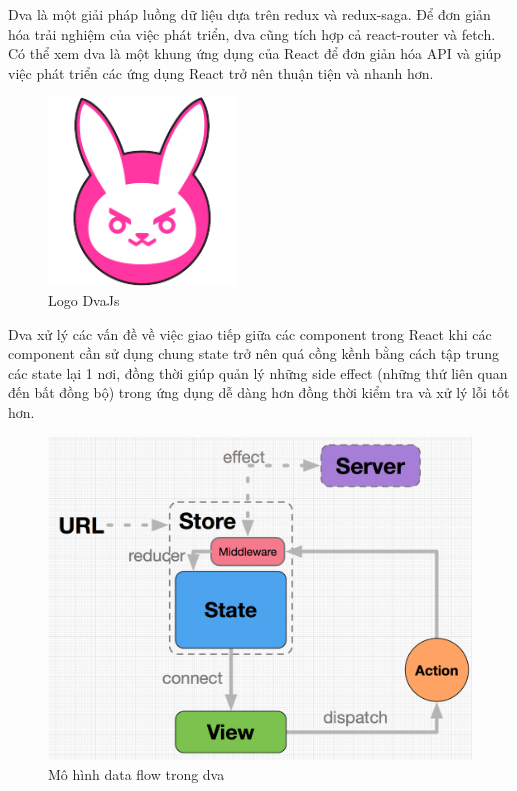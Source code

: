            \hspace*{0.5cm} Dva là một giải pháp luồng dữ liệu dựa trên redux và redux-saga. Để đơn giản hóa trải nghiệm của việc phát triển, dva cũng tích hợp cả react-router và fetch. Có thể xem dva là một khung ứng dụng của React để đơn giản hóa API và giúp việc phát triển các ứng dụng React trở nên thuận tiện và nhanh hơn.\\

            \begin{figure}[!htp]
                \begin{center}
                \includegraphics[width=5cm]{img/Technology/dva.png}
                \end{center}
                \caption{Logo DvaJs}
            \end{figure}

            Dva xử lý các vấn đề về việc giao tiếp giữa các component trong React khi các component cần sử dụng chung state trở nên quá cồng kềnh bằng cách tập trung các state lại 1 nơi, đồng thời giúp quản lý những side effect (những thứ liên quan đến bất đồng bộ) trong ứng dụng dễ dàng hơn đồng thời kiểm tra và xử lý lỗi tốt hơn.\\

            \begin{figure}[!htp]
                \begin{center}
                \includegraphics[width=14cm]{img/Technology/dva-struct.png}
                \end{center}
                \caption{Mô hình data flow trong dva}
            \end{figure}

